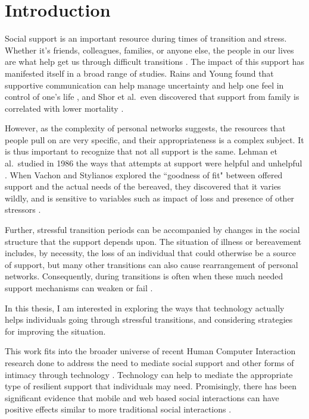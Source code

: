\chapter{Introduction}
  \label{sec:intro}
  Social support is an important resource during times of transition and stress.
  Whether it's friends, colleagues, families, or anyone else, the people in our lives
  are what help get us through difficult transitions \cite{mikal13}.
  The impact of this support has manifested itself in a broad range of studies.
  Rains and Young found that supportive communication can help manage uncertainty and
  help one feel in control of one's life \cite{rains09},
  and Shor et al.\ even discovered that support from
  family is correlated with lower mortality \cite{shor13}.

  However, as the complexity of personal networks suggests, the resources that people pull on
  are very specific,
  and their appropriateness is a complex subject.
  It is thus important to recognize that not all support is the same.
  Lehman et al.\ studied in 1986 the ways that attempts at support were helpful and unhelpful
  \cite{lehman86}.
  When Vachon and Stylianos explored the ``goodness of fit" between offered support and the actual needs of
  the bereaved, they discovered that it varies wildly, and is sensitive to variables such as impact of loss
  and presence of other stressors
  \cite{vachon88}.
  
  Further, stressful transition periods can be accompanied by changes in the social structure
  that the support depends upon.
  The situation of illness or bereavement includes, by necessity,
  the loss of an individual that could otherwise be a source of support,
  but many other transitions can also cause rearrangement of personal networks.
  Consequently, during transitions is often when these much needed
  support mechanisms can weaken or fail
  \cite{mikal13}.

  In this thesis, I am interested in exploring
  the ways that technology actually helps individuals going
  through stressful transitions,
  and considering strategies for improving the situation.

  This work fits into the broader universe of
  recent Human Computer Interaction research
  done to address the need to mediate social support
  and other forms of intimacy through technology
  \cite{hassenzhal12}.
  Technology can help to mediate the appropriate type of resilient support
  that individuals may need.
  Promisingly, there has been significant evidence that
  mobile and web based social interactions can have positive effects similar
  to more traditional social interactions
  \cite{shaw02, hjo14}.

